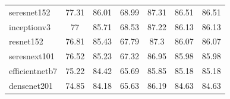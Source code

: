 \begin{table}[H]
\begin{tabular}{lcccccc}
        seresnet152                         & 77.31              & 86.01
                                            & 68.99              & 87.31 &
        86.51                               & 86.51
        \\
        inceptionv3                         & 77                 & 85.71
                                            & 68.53              & 87.22 &
        86.13                               & 86.13
        \\
        resnet152                           & 76.81              & 85.43
                                            & 67.79              & 87.3  &
        86.07                               & 86.07
        \\
        seresnext101                        & 76.52              & 85.23
                                            & 67.32              & 86.95 &
        85.98                               & 85.98
        \\
        efficientnetb7                      & 75.22              & 84.42
                                            & 65.69              & 85.85 &
        85.18                               & 85.18
        \\
        densenet201                         & 74.85              & 84.18
                                            & 65.63              & 86.19 &
        84.63                               & 84.63
        \\ \bottomrule
    \end{tabular}%

\end{table}